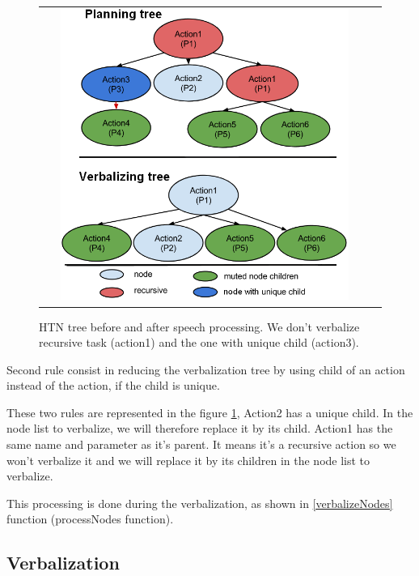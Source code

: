 \documentclass{llncs}
\begin{document}
\begin{figure}[ht!]
 \centering
 \begin{tabular}{cc}
  \includegraphics[width=0.9\textwidth]{img/rules.png}
 \end{tabular}
 \caption{HTN tree before and after speech processing. We don't verbalize recursive task (action1) and the one with unique child (action3).}
 \label{fig:tree_processing}
   \vspace{-6pt}
 \end{figure}
Second rule consist in reducing the verbalization tree by using child of an action instead of the action, if the child is unique.

These two rules are represented in the figure \ref{fig:tree_processing}, Action2 has a unique child. In the node list to verbalize, we will therefore replace it by its child. Action1 has the same name and parameter as it's parent. It means it's a recursive action so we won't verbalize it and we will replace it by its children in the node list to verbalize.

This processing is done during the verbalization, as shown in \ref{verbalizeNodes} function (processNodes function).


\subsection{Verbalization}
\end{document}
